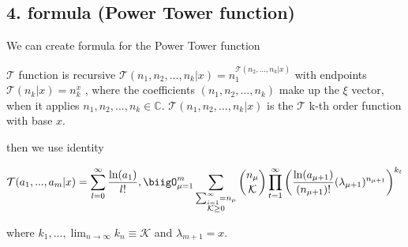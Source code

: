 \subsection{4. formula (Power Tower function)}

We can create formula for the Power Tower function

\begin{definition}
      \(\mathcal{T}\) function is recursive \(\mathcal{T}(
      n_1, n_2, ..., n_k | x) = n_1^{\mathcal{T}(n_2, ..., 
      n_k | x)}\) with endpoints \(\mathcal{T}(n_k | x ) =
      n_k^x\) , 
      where the coefficients  \((n_1, n_2, ..., n_k)\) make 
      up the \(\xi\) vector,
       when it applies \(n_1, n_2, ..., n_k \in  \mathbb{C}\).
       \(\mathcal{T}(n_1, n_2, ..., n_k | x) \) is the 
       \(\mathcal{T}\) k-th order function with base \(x\).
\end{definition}

then we use identity

\begin{align}
      \mathcal{T}(a_1, ..., a_m |x)= \sum_{l=0}^\infty 
      \frac{\ln(a_1)}{l!}, \biigO_{\mu=1}^{m}\sum_{
      \substack{\sum_{i=1}^\infty = n_\mu \\ \mathcal{K} 
      \geq 0}}\binom{n_{\mu}}{\mathcal{K}}\prod_{t=1}^\infty
      \left(\frac{\ln(a_{\mu+1})}{(n_{\mu+1})!}(\lambda_{
      \mu+1})^{n_{\mu+1}}\right)^{k_t}
\end{align}

where $k_1, ..., \lim_{n\to \infty}k_n \equiv 
\mathcal{K} $ and $\lambda_{m+1}=x$.
